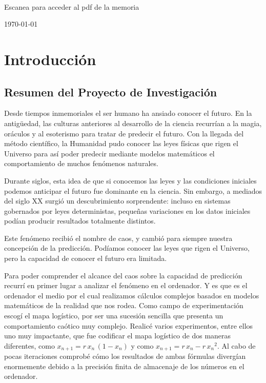 \documentclass[
  10pt,
  a4paper,
  DIV=11,
  numbers=noendperiod,
  open=any]{scrreprt}
\numberwithin{equation}{chapter}
\renewcommand{\contentsname}{Tabla de contenidos}
\numberwithin{equation}{section}
\renewcommand{\[}{\begin{equation}}
\renewcommand{\]}{\end{equation}}
\begin{document}
\begin{titlepage}
  \\[0.2cm]
  {\footnotesize Escanea para acceder al pdf de la memoria}
  \par
  \endgroup

  \vspace{0.5cm}
  {\large \today}\par
\end{titlepage}


\renewcommand*\contentsname{Índice}
{
\setcounter{tocdepth}{0}
\tableofcontents
}


\part{Introducción}

\chapter{Resumen del Proyecto de
Investigación}\label{resumen-del-proyecto-de-investigaciuxf3n}

Desde tiempos inmemoriales el ser humano ha ansiado conocer el futuro.
En la antigüedad, las culturas anteriores al desarrollo de la ciencia
recurrían a la magia, oráculos y al esoterismo para tratar de predecir
el futuro. Con la llegada del método científico, la Humanidad pudo
conocer las leyes físicas que rigen el Universo para así poder predecir mediante modelos matemáticos el comportamiento de muchos fenómenos naturales. 

Durante siglos, esta idea de que si conocemos las leyes y las
condiciones iniciales podemos anticipar el futuro fue dominante en la
ciencia. Sin embargo, a mediados del siglo XX surgió un descubrimiento
sorprendente: incluso en sistemas gobernados por leyes deterministas,
pequeñas variaciones en los datos iniciales podían producir resultados
totalmente distintos.

Este fenómeno recibió el nombre de caos, y cambió para siempre nuestra
concepción de la predicción. Podíamos conocer las leyes que rigen el
Universo, pero la capacidad de conocer el futuro era limitada.

Para poder comprender el alcance del caos sobre la capacidad de
predicción recurrí en primer lugar a analizar el fenómeno en el
ordenador. Y es que es el ordenador el medio por el cual realizamos
cálculos complejos basados en modelos matemáticos de la realidad que nos
rodea. Como campo de experimentación escogí el mapa logístico, por ser
una sucesión sencilla que presenta un comportamiento caótico muy
complejo. Realicé varios experimentos, entre ellos uno muy impactante,
que fue codificar el mapa logístico de dos maneras diferentes, como
\(x_{n+1} = r\,x_n\,(1 - x_n)\) y como
\(x_{n+1} = r\,x_n - r\,{x_n}^2\). Al cabo de pocas iteraciones comprobé
cómo los resultados de ambas fórmulas divergían enormemente debido a la
precisión finita de almacenaje de los números en el ordenador.
\end{document}
